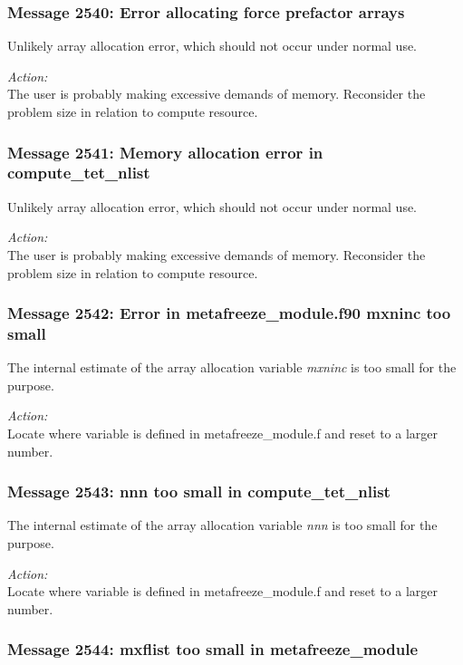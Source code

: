 \subsubsection*{Message 2540: Error allocating force prefactor arrays}

Unlikely array allocation error, which should not occur under normal use.

\noindent
{\em Action:}\\ The user is probably making excessive demands of
memory. Reconsider the problem size in relation to compute resource.
          
\subsubsection*{Message 2541: Memory allocation error in compute\_tet\_nlist}

Unlikely array allocation error, which should not occur under normal use.

\noindent
{\em Action:}\\ The user is probably making excessive demands of
memory. Reconsider the problem size in relation to compute resource.
          
\subsubsection*{Message 2542: Error in metafreeze\_module.f90 mxninc too small}
          
The internal estimate of the array allocation variable {\em mxninc} is too
small for the purpose.

\noindent
{\em Action:}\\ Locate where variable is defined in metafreeze\_module.f and
reset to a larger number.

\subsubsection*{Message 2543: nnn too small in compute\_tet\_nlist}
          
The internal estimate of the array allocation variable {\em nnn} is too
small for the purpose.

\noindent
{\em Action:}\\ Locate where variable is defined in metafreeze\_module.f and
reset to a larger number.

\subsubsection*{Message 2544: mxflist too small in metafreeze\_module}


